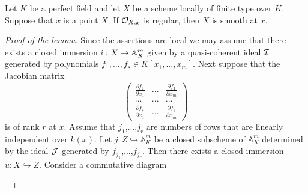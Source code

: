 \begin{lemma}\label{lemma:for_perfect_fields_regular_implies_smooth}
Let $K$ be a perfect field and let $X$ be a scheme locally of finite type over $K$. Suppose that $x$ is a point $X$. If ${\mathcal O}_{X,x}$ is regular, then $X$ is smooth at $x$.
\end{lemma}
\begin{proof}[Proof of the lemma]
Since the assertions are local we may assume that there exists a closed immersion $i:X\rightarrow \mathbb{A}^m_K$ given by a quasi-coherent ideal ${\mathcal I}$ generated by polynomials $f_1,...,f_s\in K[x_1,...,x_m]$. Next suppose that the Jacobian matrix
$$\left( \begin{array}{ccc}
\frac{\partial f_1}{\partial x_1} & ... & \frac{\partial f_1}{\partial x_{m}} \\
... &...  &...  \\
\frac{\partial f_s}{\partial x_{1}} &...  & \frac{\partial f_s}{\partial x_{m}}\end{array} \right)$$
is of rank $r$ at $x$. Assume that $j_1$,...,$j_r$ are numbers of rows that are linearly independent over $k(x)$. Let $j:Z\hookrightarrow \mathbb{A}^m_K$ be a closed subscheme of $\mathbb{A}^m_K$ determined by the ideal ${\mathcal J}$ generated by $f_{j_1}$,...,$f_{j_r}$. Then there exists a closed immersion $u:X\hookrightarrow Z$. Consider a commutative diagram
\begin{center}
\end{center}
\end{proof}
